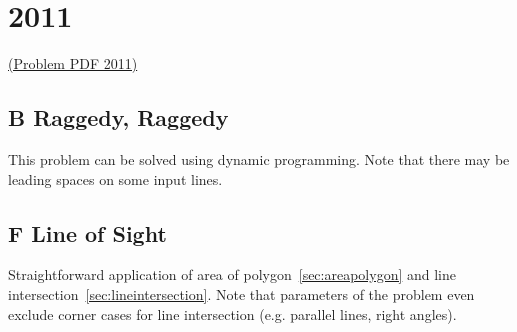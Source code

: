 
\section{2011}

\href{http://midatl.radford.edu/docs/pastProblems/11contest/MidAtlantic2011.pdf}{(Problem PDF 2011)}

\subsection{B Raggedy, Raggedy}
\label{sec:2011-b-raggedy}

This problem can be solved using dynamic programming.
Note that there may be leading spaces on some input lines.

\subsection{F Line of Sight}
\label{sec:2011-f-lineofsight}

Straightforward application of area of polygon~\ref{sec:areapolygon} and line intersection~\ref{sec:lineintersection}.
Note that parameters of the problem even exclude corner cases for line intersection (e.g. parallel lines, right angles).

